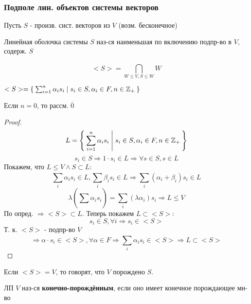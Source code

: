 \subsubsection{Подполе лин. объектов системы векторов}
Пусть $S$ - произв. сист. векторов из $V$ (возм. бесконечное)
\begin{definition}
Линейная оболочка системы $S$ наз-ся наименьшая по включению подпр-во в $V$, содерж. $S$
\end{definition}
\begin{symb}
\[
<S> = \bigcap_{W \leq V, S \leq W}^{} W
\]
\end{symb}
\begin{statement}
$<S> = \Set{\sum_{i = 1}^{n} \alpha_i s_i | s_i \in S, \alpha_i \in F, n \in \mathbb{Z}_{+}}$
\end{statement}
\begin{note}
Если $n = 0$, то рассм. $\overline{0}$
\end{note}
\begin{proof}
\[
L = \Set{\sum_{i = 1}^{n} \alpha_i s_i | s_i \in S, \alpha_i \in F, n \in \mathbb{Z}_{+}}
\]
\[
s_i \in S \Rightarrow 1 \cdot s_i \in L \Rightarrow \forall s \in S, s \in L
\]
Покажем, что $L \leq V \land S \subset L$:
\[
\sum_{i}^{} \alpha_i s_i \in L, \sum_{i}^{} \beta_i s_i \in L \Rightarrow \sum_{i}^{} (\alpha_i + \beta_i) s_i \in L
\]
\[
\lambda(\sum_{}^{} \alpha_i s_i) = \sum_{i}^{} (\lambda \alpha_i) s_i \Rightarrow L \leq V
\]
По опред. $\Rightarrow <S> \subset L$. Теперь покажем $L \subset <S>$:
\[
s_i \in S, \forall i \Rightarrow s_i \in <S>
\]
Т. к. $<S>$ - подпр-во $V$
\[
  \Rightarrow \alpha \cdot s_i \in <S>, \forall \alpha \in F\Rightarrow \sum_{i}^{} \alpha_i s_i \in <S> \Rightarrow L \subset <S>
\]
\end{proof}
\begin{definition}
Если $<S> = V$, то говорят, что $V$ порождено $S$.
\end{definition}
\begin{definition}
ЛП $V$ наз-ся \textbf{конечно-порождённым}, если оно имеет конечное порождающее мн-во
\end{definition}
